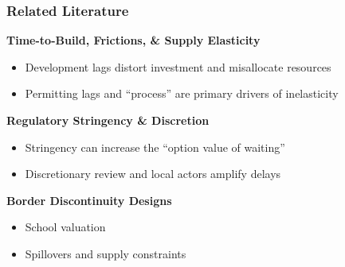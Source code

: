 \begin{frame}[shrink=5]
    \frametitle{Related Literature}

    \textbf{Time-to-Build, Frictions, \& Supply Elasticity}
    \begin{itemize}[itemsep=2pt, topsep=3pt]
        \item Development lags distort investment and misallocate resources \cite{budish_firms_2015,hsieh_housing_2019}
        \item Permitting lags and ``process'' are primary drivers of inelasticity \cite{paciorek_supply_2013, gyourko_local_2021, molloy_housing_2022}
    \end{itemize}

    \vspace{2pt}
    \textbf{Regulatory Stringency \& Discretion}
    \begin{itemize}[itemsep=2pt, topsep=3pt]
        \item Stringency can increase the ``option value of waiting'' \cite{cunningham_house_2006, bloom_impact_2009}
        \item Discretionary review and local actors amplify delays \cite{fischel_homevoter_2009, ortalo-magne_political_2014,einstein_neighborhood_2019,khan_decentralized_2021,duranton_urban_2023}
    \end{itemize}

    \vspace{2pt}
    \textbf{Border Discontinuity Designs}
    \begin{itemize}[itemsep=2pt, topsep=3pt]
        \item School valuation \citep{black_better_1999, bayer_unified_2007}
        \item Spillovers and supply constraints \citep{turner_land_2014, diamond_effects_2019, kulka_how_2022}
    \end{itemize}
\end{frame}
